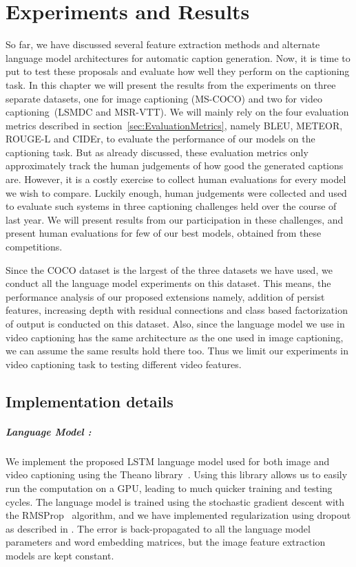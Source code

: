 \chapter{Experiments and Results}
\label{chapter:results}

So far, we have discussed several feature extraction methods and alternate
language model architectures for automatic caption generation.
Now, it is time to put to test these proposals and evaluate how well they
perform on the captioning task.
In this chapter we will present the results from the experiments on three
separate datasets, one for image captioning (MS-COCO) and two for video
captioning~(LSMDC and MSR-VTT).
We will mainly rely on the four evaluation metrics described in
section~\ref{sec:EvaluationMetrics}, namely BLEU, METEOR, ROUGE-L and CIDEr, to
evaluate the performance of our models on the captioning task.
But as already discussed, these evaluation metrics only approximately track the
human judgements of how good the generated captions are.
However, it is a costly exercise to collect human evaluations for every model we
wish to compare.
Luckily enough, human judgements were collected and used to evaluate such
systems in three captioning challenges held over the course of last year.
We will present results from our participation in these challenges, and present
human evaluations for few of our best models, obtained from these competitions.

Since the COCO dataset is the largest of the three datasets we have used, we
conduct all the language model experiments on this dataset.
This means, the performance analysis of our proposed extensions namely, addition
of persist features, increasing depth with residual connections and class based
factorization of output is conducted on this dataset.
Also, since the language model we use in video captioning has the same
architecture as the one used in image captioning, we can assume the same results
hold there too.
Thus we limit our experiments in video captioning task to testing different
video features.

\section{Implementation details}
\paragraph*{Language Model :} We implement the proposed LSTM language model used
for both image and video captioning using the Theano
library~\cite{Bastien-Theano-2012}.%
Using this library allows us to easily run the computation on a GPU, leading to
much quicker training and testing cycles.
The language model is trained using the stochastic gradient descent with the
RMSProp~\cite{rmspropTielman} algorithm, and we have implemented regularization
using dropout as described in \cite{ZarembaSV14}.
The error is back-propagated to all the language model parameters and word
embedding matrices, but the image feature extraction models are kept constant.

